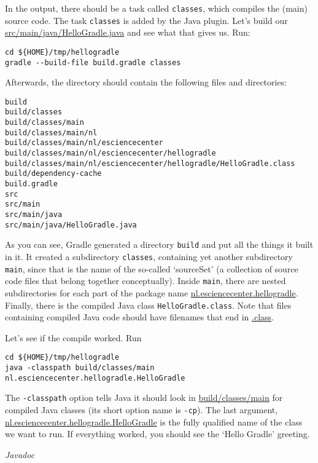 In the output, there should be a task called \texttt{classes}, which compiles the (main) source code. The task \texttt{classes} is added by the Java plugin. Let's build our \url{src/main/java/HelloGradle.java} and see what that gives us. Run:
\begin{lstlisting}[style=basic,style=bash]
cd ${HOME}/tmp/hellogradle
gradle --build-file build.gradle classes
\end{lstlisting} %
Afterwards, the directory should contain the following files and directories:
\begin{lstlisting}[style=basic,style=bash]
build
build/classes
build/classes/main
build/classes/main/nl
build/classes/main/nl/esciencecenter
build/classes/main/nl/esciencecenter/hellogradle
build/classes/main/nl/esciencecenter/hellogradle/HelloGradle.class
build/dependency-cache
build.gradle
src
src/main
src/main/java
src/main/java/HelloGradle.java
\end{lstlisting}
As you can see, Gradle generated a directory \texttt{build} and put all the things it built in it. It created a subdirectory \texttt{classes}, containing yet another subdirectory \texttt{main}, since that is the name of the so-called \mbox{`sourceSet'} (a collection of source code files that belong together conceptually). Inside \texttt{main}, there are nested subdirectories for each part of the package name \url{nl.esciencecenter.hellogradle}. Finally, there is the compiled Java class \texttt{HelloGradle.class}. Note that files containing compiled Java code should have filenames that end in \url{.class}.

Let's see if the compile worked. Run
\begin{lstlisting}[style=basic,style=bash]
cd ${HOME}/tmp/hellogradle
java -classpath build/classes/main nl.esciencecenter.hellogradle.HelloGradle
\end{lstlisting} %
The \texttt{-classpath} option tells Java it should look in \url{build/classes/main} for compiled Java classes (its short option name is \texttt{-cp}). The last argument, \url{nl.esciencecenter.hellogradle.HelloGradle} is the fully qualified name of the class we want to run. If everything worked, you should see the `Hello Gradle' greeting.

\vspace{2em}
\textit{Javadoc}

